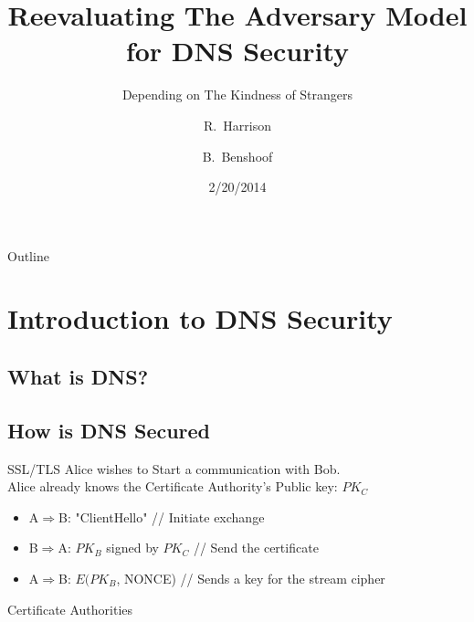 \documentclass{beamer}
\title[Short Paper Title] %
{Reevaluating The Adversary Model for DNS Security}
\subtitle
{Depending on The Kindness of Strangers} %
\author[Author, Another] %
{R.~Harrison \and B.~Benshoof}
\institute[] %
{
  Department of Computer Science\\
  Geoorgia State University
}
\date[Short Occasion] %
{2/20/2014}
\begin{document}
\begin{frame}
  \titlepage
\end{frame}

\begin{frame}{Outline}
  \tableofcontents
\end{frame}




\section{Introduction to DNS Security}

\subsection[DNS]{What is DNS?}


\subsection{How is DNS Secured}

\begin{frame}{SSL/TLS}
	Alice wishes to Start a communication with Bob.\\
	Alice already knows the Certificate Authority's Public key: $PK_{C}$\\
	\begin{itemize}
		\item{ A$\Rightarrow{}$B: "ClientHello" // Initiate exchange} 
		\item{ B$\Rightarrow{}$A: $PK_{B}$ signed by $PK_{C}$ // Send the certificate}
		\item{ A$\Rightarrow{}$B: $E(PK_{B}$, NONCE) // Sends a key for the stream cipher } 
	\end{itemize}

\end{frame}

\begin{frame}{Certificate Authorities}
\end{frame}
\end{document}

